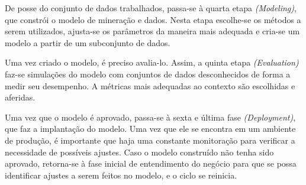 De posse do conjunto de dados trabalhados, passa-se à quarta etapa \textit{(Modeling)}, que constrói o modelo de mineração e dados. Nesta etapa escolhe-se os métodos a serem utilizados, ajusta-se os parâmetros da maneira mais adequada e cria-se um modelo a partir de um subconjunto de dados. 

Uma vez criado o modelo, é preciso avalia-lo. Assim, a quinta etapa \textit{(Evaluation) }faz-se simulações do modelo com conjuntos de dados desconhecidos de forma a medir seu desempenho. A métricas mais adequadas ao contexto são escolhidas e aferidas. 

Uma vez que o modelo é aprovado, passa-se à sexta e última fase \textit{(Deployment)}, que faz a implantação do modelo. Uma vez que ele se encontra em um ambiente de produção, é importante que haja uma constante monitoração para verificar a necessidade de possíveis ajustes. Caso o modelo construído não tenha sido aprovado, retorna-se à fase inicial de entendimento do negócio para que se possa identificar ajustes a serem feitos no modelo, e o ciclo se reinicia. 
